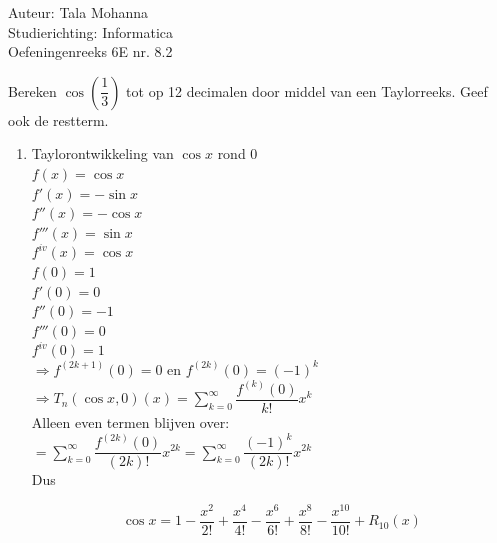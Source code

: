 \documentclass[a4paper]{article}
\begin{document}
\noindent \large Auteur: Tala Mohanna \\
\noindent \large Studierichting: Informatica\\
\noindent \large Oefeningenreeks 6E nr. 8.2\\

\medskip

\normalsize

Bereken $\cos\left(\dfrac13\right)$ tot op 12 decimalen door middel van een Taylorreeks. Geef ook de restterm.

\begin{enumerate}

\item Taylorontwikkeling van $\cos x$ rond $0$\\

$f(x)=\cos x$\\

$f'(x)=-\sin x$\\

$f''(x)=-\cos x$\\

$f'''(x)=\sin x$\\

$f^{iv}(x)=\cos x$\\

$f(0)=1$\\

$f'(0)=0$\\

$f''(0)=-1$\\

$f'''(0)=0$\\

$f^{iv}(0)=1$\\

$\Rightarrow f^{(2k+1)}(0)=0$ en $f^{(2k)}(0)=(-1)^k$\\

$\Rightarrow T_n\left(\cos x,0\right)(x)=\displaystyle\sum_{k=0}^{\infty}\dfrac{f^{(k)}(0)}{k!}x^k$\\

Alleen even termen blijven over:\\

$=\displaystyle\sum_{k=0}^{\infty}\dfrac{f^{(2k)}(0)}{(2k)!}x^{2k}
=\displaystyle\sum_{k=0}^{\infty}\dfrac{(-1)^k}{(2k)!}x^{2k}$\\

Dus

\[
\cos x
=
1-\dfrac{x^2}{2!}
+\dfrac{x^4}{4!}
-\dfrac{x^6}{6!}
+\dfrac{x^8}{8!}
-\dfrac{x^{10}}{10!}
+R_{10}(x)
\]


\end{enumerate}
\end{document}
